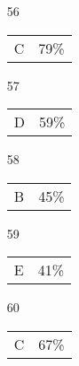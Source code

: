\documentclass[12pt]{article}
\begin{document}
\begin{multicols}{5}
\begin{enumerate}
\item[]
\item[56] \begin{tabular}{cc} C & 79\%\end{tabular}
\item[57] \begin{tabular}{cc} D & 59\%\end{tabular}
\item[58] \begin{tabular}{cc} B & 45\%\end{tabular}
\item[59] \begin{tabular}{cc} E & 41\%\end{tabular}
\item[60] \begin{tabular}{cc} C & 67\%\end{tabular}

\item[]


\end{enumerate}
\end{multicols}
\end{document}
